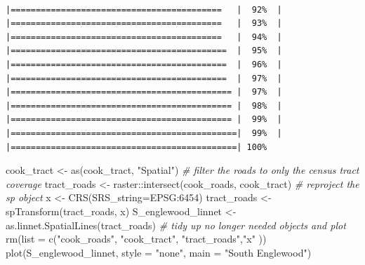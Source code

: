 \documentclass[
  krantz2]{krantz}
\makeatletter
\newenvironment{Shaded}{\begin{snugshade}}{\end{snugshade}}
\newcommand{\AttributeTok}[1]{\textcolor[rgb]{0.61,0.61,0.61}{#1}}
\newcommand{\CommentTok}[1]{\textcolor[rgb]{0.37,0.37,0.37}{\textit{#1}}}
\newcommand{\FunctionTok}[1]{\textcolor[rgb]{0,0,0}{#1}}
\newcommand{\NormalTok}[1]{#1}
\newcommand{\OtherTok}[1]{\textcolor[rgb]{0.37,0.37,0.37}{#1}}
\newcommand{\SpecialCharTok}[1]{\textcolor[rgb]{0,0,0}{#1}}
\newcommand{\StringTok}[1]{\textcolor[rgb]{0.5,0.5,0.5}{#1}}
\newenvironment{kframe}{%
\medskip{}
\setlength{\fboxsep}{.8em}
 \def\at@end@of@kframe{}%
 \ifinner\ifhmode%
  \def\at@end@of@kframe{\end{minipage}}%
  \begin{minipage}{\columnwidth}%
 \fi\fi%
 \def\FrameCommand##1{\hskip\@totalleftmargin \hskip-\fboxsep
 \colorbox{shadecolor}{##1}\hskip-\fboxsep
     \hskip-\linewidth \hskip-\@totalleftmargin \hskip\columnwidth}%
 \MakeFramed {\advance\hsize-\width
   \@totalleftmargin\z@ \linewidth\hsize
   \@setminipage}}%
 {\par\unskip\endMakeFramed%
 \at@end@of@kframe}
\renewenvironment{Shaded}{\begin{kframe}}{\end{kframe}}
\makeatother
\begin{document}
\begin{verbatim}
                             |==========================================   |  92%  |                                                     |==========================================   |  93%  |                                                     |==========================================   |  94%  |                                                     |===========================================  |  95%  |                                                     |===========================================  |  96%  |                                                     |===========================================  |  97%  |                                                     |============================================ |  97%  |                                                     |============================================ |  98%  |                                                     |============================================ |  99%  |                                                     |=============================================|  99%  |                                                     |=============================================| 100%
\end{verbatim}

\begin{Shaded}
\begin{Highlighting}[]
\NormalTok{cook\_tract }\OtherTok{\textless{}{-}} \FunctionTok{as}\NormalTok{(cook\_tract, }\StringTok{"Spatial"}\NormalTok{)}
\CommentTok{\# filter the roads to only the census tract coverage}
\NormalTok{tract\_roads }\OtherTok{\textless{}{-}}\NormalTok{ raster}\SpecialCharTok{::}\FunctionTok{intersect}\NormalTok{(cook\_roads, cook\_tract)}
\CommentTok{\# reproject the sp object}
\NormalTok{x }\OtherTok{\textless{}{-}} \FunctionTok{CRS}\NormalTok{(}\AttributeTok{SRS\_string=}\StringTok{\textquotesingle{}EPSG:6454\textquotesingle{}}\NormalTok{)}
\NormalTok{tract\_roads }\OtherTok{\textless{}{-}} \FunctionTok{spTransform}\NormalTok{(tract\_roads, x)}
\NormalTok{S\_englewood\_linnet }\OtherTok{\textless{}{-}} \FunctionTok{as.linnet.SpatialLines}\NormalTok{(tract\_roads)}
\CommentTok{\# tidy up no longer needed objects and plot}
\FunctionTok{rm}\NormalTok{(}\AttributeTok{list =} \FunctionTok{c}\NormalTok{(}\StringTok{"cook\_roads"}\NormalTok{, }\StringTok{"cook\_tract"}\NormalTok{, }\StringTok{"tract\_roads"}\NormalTok{,}\StringTok{"x"}\NormalTok{ ))}
\FunctionTok{plot}\NormalTok{(S\_englewood\_linnet, }\AttributeTok{style =} \StringTok{"none"}\NormalTok{, }\AttributeTok{main =} \StringTok{"South Englewood"}\NormalTok{)}
\end{Highlighting}
\end{Shaded}
\end{document}

